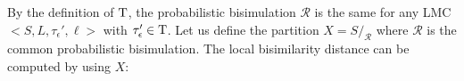 \documentclass[a4paper,UKenglish,cleveref,autoref,thm-restate]{lipics-v2021}
\newcommand{\local}{\mathit{local}}
\newcommand{\Hyp}{\mathcal{M}'}%
\newcommand{\tauHyp}{\tau_{\epsilon}}
\newcommand{\R}{\mathcal{R}}
\begin{document}
By the definition of ${\rm T}$, the probabilistic bisimulation $\R$ is the same for any LMC $<S, L, \tauHyp', \ell>$ with $\tauHyp' \in {\rm T}$. Let us define the partition $X = S /_\R$ where $\R$ is the common probabilistic bisimulation. The local bisimilarity distance can be computed by using $X$:






%	
\end{document}
